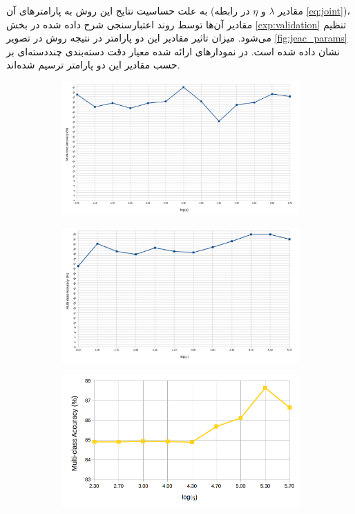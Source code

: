 به علت حساسیت نتایج این روش به پارامترهای آن  (مقادیر  $\lambda$ و $\eta$ در رابطه \eqref{eq:joint})، مقادیر آن‌ها توسط روند اعتبارسنجی شرح داده شده در بخش
\ref{exp:validation}
تنظیم می‌شود. میزان تاثیر مقادیر این دو پارامتر در نتیجه روش در تصویر \ref{fig:jeac_params} نشان داده شده است. در نمودارهای ارائه شده معیار دقت دسته‌بندی چنددسته‌ای بر حسب مقادیر این دو پارامتر ترسیم شده‌اند.
 \begin{figure}[!h]
   \captionsetup[subfigure]{labelformat=empty, font=footnotesize}
  \centering
  \begin{subfigure}[b]{0.43\linewidth}
    \includegraphics[width=\linewidth]{images/jeac_gamma}
  \end{subfigure}
  \begin{subfigure}[b]{0.43\linewidth}
    \includegraphics[width=\linewidth]{images/jeac_lambda}
  \end{subfigure}
    \begin{subfigure}[b]{0.43\linewidth}
    \includegraphics[width=\linewidth]{images/jeac_gamma_awa}

\end{subfigure}
\end{figure}
